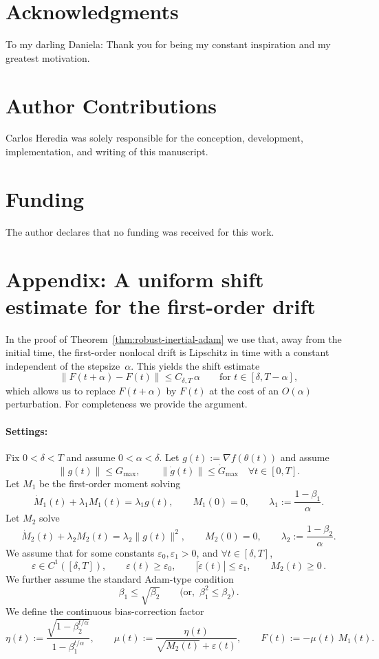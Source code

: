 \documentclass{article} %
\begin{document}
\section*{Acknowledgments}
To my darling Daniela: Thank you for being my constant inspiration and my greatest motivation.

\section*{Author Contributions}
Carlos Heredia was solely responsible for the conception, development, implementation, and writing of this manuscript.

\section*{Funding}
The author declares that no funding was received for this work.

\appendix

\section{Appendix: A uniform shift estimate for the first-order drift}\label{app:shift-estimate}

In the proof of Theorem~\ref{thm:robust-inertial-adam} we use that, away from the initial time, the first-order nonlocal drift is Lipschitz in time with a constant independent of the stepsize~$\alpha$. This yields the shift estimate
\[
\|F(t+\alpha)-F(t)\|\le C_{\delta,T}\,\alpha
\qquad \text{for } t\in[\delta,T-\alpha],
\]
which allows us to replace $F(t+\alpha)$ by $F(t)$ at the cost of an $O(\alpha)$ perturbation. For completeness we provide the argument.

\paragraph{Settings:} Fix $0<\delta<T$ and assume $0<\alpha<\delta$.
Let $g(t):=\nabla f(\theta(t))$ and assume
\[
\|g(t)\|\le G_{\max},\qquad 
\|\dot g(t)\|\le \dot G_{\max}\quad \forall t\in[0,T].
\]
Let $M_1$ be the first-order moment solving
\begin{equation}\label{eq:M1_eq_diff}
\dot M_1(t)+\lambda_1 M_1(t)=\lambda_1 g(t),\qquad M_1(0)=0,\qquad 
\lambda_1:=\frac{1-\beta_1}{\alpha}.    
\end{equation}
Let $M_2$ solve
\[
\dot M_2(t)+\lambda_2 M_2(t)=\lambda_2 \|g(t)\|^2,\qquad M_2(0)=0,\qquad
\lambda_2:=\frac{1-\beta_2}{\alpha}.
\]
We assume that for some constants $\varepsilon_0,\varepsilon_1>0$, and $\forall t\in[\delta,T]$,
\[
\varepsilon\in C^1([\delta,T]),\qquad \varepsilon(t)\ge \varepsilon_0,\qquad |\dot\varepsilon(t)|\le \varepsilon_1,
\qquad M_2(t)\ge 0\,.
\]
We further assume the standard Adam-type condition
\begin{equation}\label{eq:beta_condition_sqrt}
\beta_1\le \sqrt{\beta_2}
\qquad\text{(or, }\,\beta_1^2\leq \beta_2\text{)}\,.
\end{equation}
We define the continuous bias-correction factor
\[
\eta(t):=\frac{\sqrt{1-\beta_2^{t/\alpha}}}{1-\beta_1^{t/\alpha}},
\qquad
\mu(t):=\frac{\eta(t)}{\sqrt{M_2(t)}+\varepsilon(t)},
\qquad 
F(t):=-\mu(t)\,M_1(t).
\]
\end{document}
